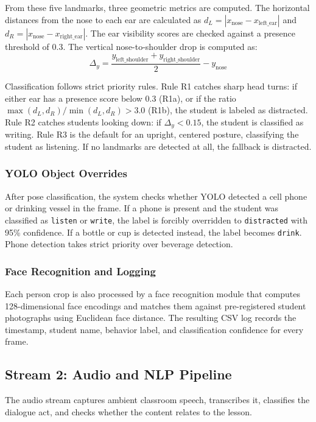 \documentclass[conference]{IEEEtran}
\begin{document}
From these five landmarks, three geometric metrics are computed. The horizontal distances from the nose to each ear are calculated as $d_L = |x_{\text{nose}} - x_{\text{left\_ear}}|$ and $d_R = |x_{\text{nose}} - x_{\text{right\_ear}}|$. The ear visibility scores are checked against a presence threshold of 0.3. The vertical nose-to-shoulder drop is computed as:
\begin{equation}
\Delta_y = \frac{y_{\text{left\_shoulder}} + y_{\text{right\_shoulder}}}{2} - y_{\text{nose}}
\label{eq:drop}
\end{equation}

Classification follows strict priority rules. Rule R1 catches sharp head turns: if either ear has a presence score below 0.3 (R1a), or if the ratio $\max(d_L, d_R) / \min(d_L, d_R) > 3.0$ (R1b), the student is labeled as distracted. Rule R2 catches students looking down: if $\Delta_y < 0.15$, the student is classified as writing. Rule R3 is the default for an upright, centered posture, classifying the student as listening. If no landmarks are detected at all, the fallback is distracted.

\subsubsection{YOLO Object Overrides}
After pose classification, the system checks whether YOLO detected a cell phone or drinking vessel in the frame. If a phone is present and the student was classified as \texttt{listen} or \texttt{write}, the label is forcibly overridden to \texttt{distracted} with 95\% confidence. If a bottle or cup is detected instead, the label becomes \texttt{drink}. Phone detection takes strict priority over beverage detection.

\subsubsection{Face Recognition and Logging}
Each person crop is also processed by a face recognition module that computes 128-dimensional face encodings and matches them against pre-registered student photographs using Euclidean face distance. The resulting CSV log records the timestamp, student name, behavior label, and classification confidence for every frame.

\subsection{Stream 2: Audio and NLP Pipeline}
The audio stream captures ambient classroom speech, transcribes it, classifies the dialogue act, and checks whether the content relates to the lesson.
\end{document}
